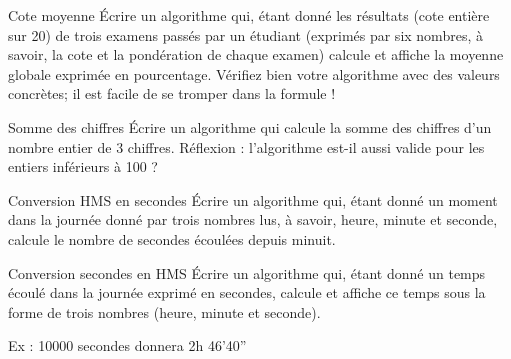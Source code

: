 \begin{Exercice}{Cote moyenne}
	Écrire un algorithme qui, étant donné les résultats (cote entière sur
	20) de trois examens passés par un étudiant (exprimés par six nombres,
	à savoir, la cote et la pondération de chaque examen) calcule et
	affiche la moyenne globale exprimée en pourcentage. Vérifiez bien votre
	algorithme avec des valeurs concrètes; il est facile de se tromper dans
	la formule !
\end{Exercice}

\begin{Exercice}{Somme des chiffres}
	Écrire un algorithme qui calcule la somme des chiffres
	d'un nombre entier de 3 chiffres.
	Réflexion : l’algorithme est-il aussi valide pour les entiers inférieurs
	à 100 ?
\end{Exercice}

\begin{Exercice}{Conversion HMS en secondes}
	Écrire un algorithme qui, étant donné un moment dans la journée donné
	par trois nombres lus, à savoir, heure, minute et seconde, calcule le
	nombre de secondes écoulées depuis minuit.
\end{Exercice}

\begin{Exercice}{Conversion secondes en HMS}
	Écrire un algorithme qui, étant donné un temps écoulé dans la journée
	exprimé en secondes, calcule et affiche ce temps sous la forme de trois
	nombres (heure, minute et seconde).

	Ex : 10000 secondes donnera 2h 46'40''
\end{Exercice}
